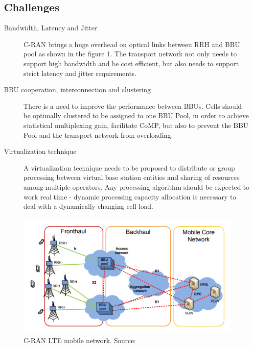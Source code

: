 \documentclass{article}
\begin{document}

\subsection{Challenges}\nocite{checko14}

\begin{description}
    
    \item [Bandwidth, Latency and Jitter] C-RAN brings a huge
    overhead on optical links between RRH and BBU pool as shown
    in the figure 1.
    The transport network not only needs to support high bandwidth 
    and be cost efficient, but also needs to support strict latency 
    and jitter requirements.
    
    \item [BBU cooperation, interconnection and clustering] 
    There is a need to improve the performance between BBUs. 
    Cells should be optimally clustered to be assigned to one
    BBU Pool, in order to achieve statistical multiplexing gain,
    facilitate CoMP, but also to prevent the BBU Pool and the
    transport network from overloading. 
    
    \item [Virtualization technique] A virtualization technique
    needs to be proposed to distribute or group processing between
    virtual base station entities and sharing of resources among 
    multiple operators. Any processing algorithm should be 
    expected to work real time - dynamic processing capacity 
    allocation is necessary to deal with a dynamically changing
    cell load.
    
\end{description}



\begin{figure}
  \includegraphics[scale=0.7]{res/LTE_CRAN.PNG}
    \caption{C-RAN LTE mobile network. Source: \parencite{checko14}}
  \label{fig:LTE_CRAN}
\end{figure}
\end{document}

